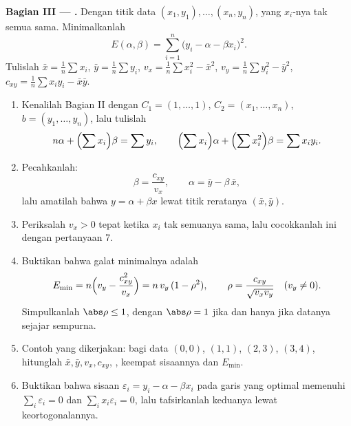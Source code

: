 \begin{problem}
\medskip
\noindent\textbf{Bagian III --- .} Dengan titik data
$(x_1, y_1), \dots, (x_n, y_n)$, yang $x_i$-nya tak semua sama. Minimalkanlah
\[
E(\alpha, \beta) = \sum_{i=1}^{n}\bigl(y_i - \alpha - \beta
x_i\bigr)^2 .
\]
Tulislah $\bar x = \frac1n\sum x_i$, $\bar y = \frac1n\sum y_i$,
$v_x = \frac1n\sum x_i^2 - \bar x^2$, $v_y = \frac1n\sum y_i^2 -
\bar y^2$, $c_{xy} = \frac1n\sum x_i y_i - \bar x\bar y$.
\begin{enumerate}[resume]
  \item Kenalilah Bagian II dengan $C_1 = (1, \dots, 1)$, $C_2 =
        (x_1, \dots, x_n)$, $b = (y_1, \dots, y_n)$, lalu tulislah
        \[
        n\alpha + \Bigl(\sum x_i\Bigr)\beta = \sum y_i,
        \qquad
        \Bigl(\sum x_i\Bigr)\alpha + \Bigl(\sum
        x_i^2\Bigr)\beta = \sum x_i y_i .
        \]
  \item Pecahkanlah:
        \[
        \beta = \frac{c_{xy}}{v_x},
        \qquad
        \alpha = \bar y - \beta\,\bar x ,
        \]
        lalu amatilah bahwa \emph{} $y = \alpha
        + \beta x$ lewat titik reratanya $(\bar x, \bar
        y)$.
  \item Periksalah $v_x > 0$ tepat ketika $x_i$ tak semuanya
        sama, lalu cocokkanlah ini dengan pertanyaan 7.
  \item Buktikan bahwa galat minimalnya adalah
        \[
        E_{\min} = n\Bigl(v_y - \frac{c_{xy}^2}{v_x}\Bigr)
        = n\,v_y\,(1 - \rho^2),
        \qquad
        \rho = \frac{c_{xy}}{\sqrt{v_x v_y}}
        \quad (v_y \neq 0).
        \]
        Simpulkanlah $\abs\rho \leq 1$, dengan $\abs\rho = 1$ jika dan
        hanya jika datanya sejajar sempurna.
  \item Contoh yang dikerjakan: bagi data $(0,0)$, $(1,1)$, $(2,3)$,
        $(3,4)$, hitunglah $\bar x, \bar y, v_x, c_{xy}$,
        , keempat sisaannya dan $E_{\min}$.
  \item Buktikan bahwa sisaan $\varepsilon_i = y_i - \alpha -
        \beta x_i$ pada garis yang optimal memenuhi $\sum_i
        \varepsilon_i = 0$ dan $\sum_i x_i\varepsilon_i = 0$,
        lalu tafsirkanlah keduanya lewat keortogonalannya.
\end{enumerate}


\end{problem}
